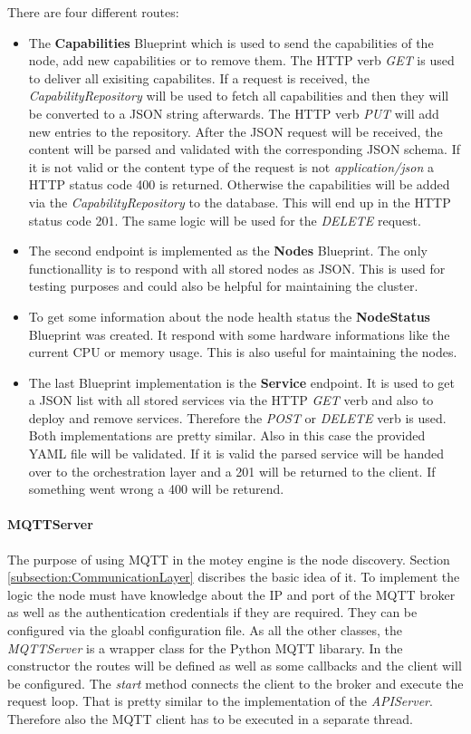 There are four different routes:
\begin{itemize}
  \item The \textbf{Capabilities} Blueprint which is used to send the capabilities of the node, add new capabilities or to remove them.
  The \ac{HTTP} verb \textit{GET} is used to deliver all exisiting capabilites.
  If a request is received, the \textit{CapabilityRepository} will be used to fetch all capabilities and then they will be converted to a JSON string afterwards.
  The \ac{HTTP} verb \textit{PUT} will add new entries to the repository.
  After the \ac{JSON} request will be received, the content will be parsed and validated with the corresponding \ac{JSON} schema.
  If it is not valid or the content type of the request is not \textit{application/json} a \ac{HTTP} status code 400 is returned.
  Otherwise the capabilities will be added via the \textit{CapabilityRepository} to the database.
  This will end up in the \ac{HTTP} status code 201.
  The same logic will be used for the \textit{DELETE} request.
  \item The second endpoint is implemented as the \textbf{Nodes} Blueprint.
  The only functionallity is to respond with all stored nodes as \ac{JSON}.
  This is used for testing purposes and could also be helpful for maintaining the cluster.
  \item To get some information about the node health status the \textbf{NodeStatus} Blueprint was created.
  It respond with some hardware informations like the current \ac{CPU} or memory usage.
  This is also useful for maintaining the nodes.
  \item The last Blueprint implementation is the \textbf{Service} endpoint.
  It is used to get a \ac{JSON} list with all stored services via the \ac{HTTP} \textit{GET} verb and also to deploy and remove services.
  Therefore the \textit{POST} or \textit{DELETE} verb is used.
  Both implementations are pretty similar.
  Also in this case the provided \ac{YAML} file will be validated.
  If it is valid the parsed service will be handed over to the orchestration layer and a 201 will be returned to the client.
  If something went wrong a 400 will be returend.
\end{itemize}

\paragraph{MQTTServer}
The purpose of using \ac{MQTT} in the motey engine is the node discovery.
Section \ref{subsection:CommunicationLayer} discribes the basic idea of it.
To implement the logic the node must have knowledge about the \ac{IP} and port of the \ac{MQTT} broker as well as the authentication credentials if they are required.
They can be configured via the gloabl configuration file.
As all the other classes, the \textit{MQTTServer} is a wrapper class for the Python \ac{MQTT} libarary.
In the constructor the routes will be defined as well as some callbacks and the client will be configured.
The \textit{start} method connects the client to the broker and execute the request loop.
That is pretty similar to the implementation of the \textit{APIServer}.
Therefore also the \ac{MQTT} client has to be executed in a separate thread.


